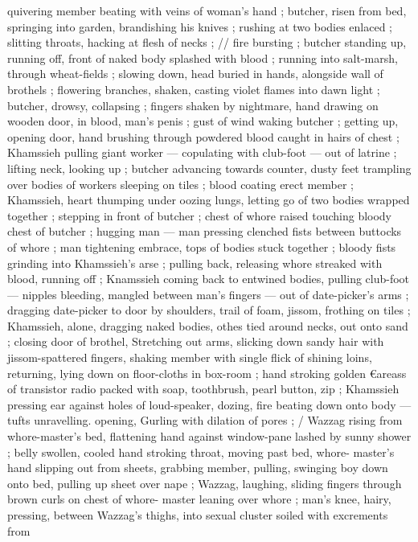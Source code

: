quivering member beating with veins of woman's hand ; butcher,
risen from bed, springing into garden, brandishing his knives ;
rushing at two bodies enlaced ; slitting throats, hacking at flesh of
necks ; // fire bursting ; butcher standing up, running off, front of
naked body splashed with blood ; running into salt-marsh, through
wheat-fields ; slowing down, head buried in hands, alongside wall of
brothels ; flowering branches, shaken, casting violet flames into
dawn light ; butcher, drowsy, collapsing ; fingers shaken by
nightmare, hand drawing on wooden door, in blood, man's penis ;
gust of wind waking butcher ; getting up, opening door, hand
brushing through powdered blood caught in hairs of chest ;
Khamssieh pulling giant worker --- copulating with club-foot --- out
of latrine ; lifting neck, looking up ; butcher advancing towards
counter, dusty feet trampling over bodies of workers sleeping on
tiles ; blood coating erect member ; Khamssieh, heart thumping
under oozing lungs, letting go of two bodies wrapped together ;
stepping in front of butcher ; chest of whore raised touching bloody
chest of butcher ; hugging man --- man pressing clenched fists
between buttocks of whore ; man tightening embrace, tops of bodies
stuck together ; bloody fists grinding into Khamssieh's arse ; pulling
back, releasing whore streaked with blood, running off ; Knamssieh
coming back to entwined bodies, pulling club-foot --- nipples
bleeding, mangled between man's fingers --- out of date-picker's
arms ; dragging date-picker to door by shoulders, trail of foam,
jissom, frothing on tiles ; Khamssieh, alone, dragging naked bodies,
othes tied around necks, out onto sand ; closing door of brothel,
Stretching out arms, slicking down sandy hair with jissom-spattered
fingers, shaking member with single flick of shining loins, returning,
lying down on floor-cloths in box-room ; hand stroking golden
€areass of transistor radio packed with soap, toothbrush, pearl
button, zip ; Khamssieh pressing ear against holes of loud-speaker,
dozing, fire beating down onto body --- tufts unravelling. opening,
Gurling with dilation of pores ; / Wazzag rising from whore-master's
bed, flattening hand against window-pane lashed by sunny shower ;
belly swollen, cooled hand stroking throat, moving past bed, whore-
master’s hand slipping out from sheets, grabbing member, pulling,
swinging boy down onto bed, pulling up sheet over nape ; Wazzag,
laughing, sliding fingers through brown curls on chest of whore-
master leaning over whore ; man's knee, hairy, pressing, between
Wazzag's thighs, into sexual cluster soiled with excrements from
